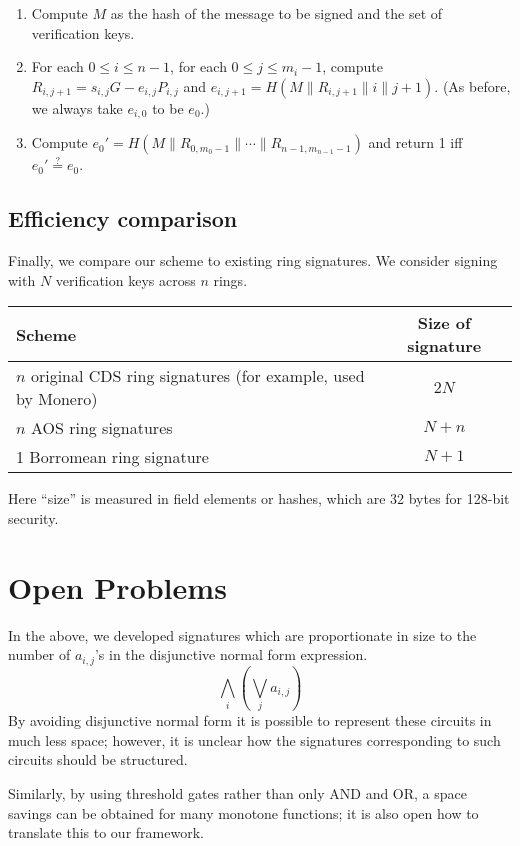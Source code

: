 \documentclass[letterpaper]{article}
\begin{document}
\begin{enumerate}
\item Compute $M$ as the hash of the message to be signed and the set of
verification keys.
\item For each $0\leq i\leq n -1$,
      for each $0\leq j\leq m_i - 1$, compute $R_{i,j+1} = s_{i,j}G - e_{i,j}P_{i,j}$
and $e_{i,j+1} = H(M\|R_{i,j+1}\|i\|j+1)$. (As before, we always take $e_{i,0}$ to be $e_0$.)
\item Compute $e_0' = H(M\|R_{0,m_0-1} \|\cdots \| R_{n-1,m_{n-1}-1})$ and return 1 iff $e_0'\stackrel{?}{=} e_0$.
\end{enumerate}

\subsection{Efficiency comparison}

Finally, we compare our scheme to existing ring signatures. We consider signing
with $N$ verification keys across $n$ rings.

\begin{center}
\begin{tabular}{|l|c|}
\hline
\textbf{Scheme} & \textbf{Size of signature}	\\
\hline
\parbox[t]{6cm}{$n$ original CDS ring signatures\cite{cramer+damgard+schoenmakers1994}\\
(for example, used by Monero)} & $2N$	\\
\hline
$n$ AOS ring signatures & $N + n$	\\
 Borromean ring signature & $N + 1$	\\
\hline
\end{tabular}
\end{center}
Here ``size'' is measured in field elements or hashes, which are 32 bytes for
128-bit security.

\section{Open Problems}

In the above, we developed signatures which are proportionate in size to the
number of $a_{i,j}$'s in the disjunctive normal form expression.
\[ \bigwedge_i \left(\bigvee_j a_{i,j}\right) \]
By avoiding disjunctive normal form it is possible to represent these circuits
in much less space; however, it is unclear how the signatures corresponding
to such circuits should be structured.

Similarly, by using threshold gates rather than only AND and OR, a space
savings can be obtained for many monotone functions; it is also open how to
translate this to our framework.


\nolinenumbers
\clearpage


\end{document}
